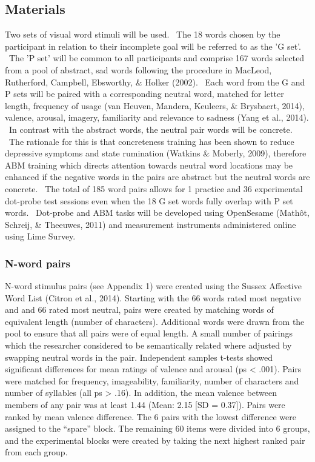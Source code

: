 \documentclass[man,a4paper,biblatex]{apa6}
\begin{document}
\subsection{Materials}

Two sets of visual word stimuli will be used. \ The 18 words chosen by
the participant in relation to their incomplete goal will be referred
to as the 'G set'. \ The 'P set' will be common to all participants
and comprise 167 words selected from a pool of abstract, sad words
following the procedure in MacLeod, Rutherford, Campbell, Ebsworthy, \&
Holker (2002). \ Each word from the G and P sets will be paired with
a corresponding neutral word, matched for letter length, frequency of
usage (van Heuven, Mandera, Keuleers, \& Brysbaert, 2014), valence,
arousal, imagery, familiarity and relevance to sadness (Yang et al.,
2014). \ In contrast with the abstract words, the neutral pair words will
be concrete. \ The rationale for this is that concreteness training has
been shown to reduce depressive symptoms and state rumination (Watkins \&
Moberly, 2009), therefore ABM training which directs attention towards
neutral word locations may be enhanced if the negative words in the
pairs are abstract but the neutral words are concrete. \ The total of
185 word pairs allows for 1 practice and 36 experimental dot-probe test
sessions even when the 18 G set words fully overlap with P set words. \
Dot-probe and ABM tasks will be developed using OpenSesame (Math\^ot,
Schreij, \& Theeuwes, 2011) and measurement instruments administered
online using Lime Survey.

\subsubsection{N-word pairs}

N-word stimulus pairs (see Appendix 1) were created using the Sussex
Affective Word List (Citron et al., 2014). Starting with the 66
words rated most negative and and 66 rated most neutral, pairs were
created by matching words of equivalent length (number of characters).
Additional words were drawn from the pool to ensure that all pairs were of
equal length.  A small number of pairings which the researcher considered
to be semantically related where adjusted by swapping neutral words in
the pair.  Independent samples t-tests showed significant differences for
mean ratings of valence and arousal (ps < .001).  Pairs were matched
for frequency, imageability, familiarity, number of characters and
number of syllables (all  ps > .16).  In addition, the mean valence
between members of any pair was at least 1.44  (Mean: 2.15 [SD = 0.37]).
Pairs were ranked by mean valence difference.  The 6 pairs with the
lowest difference were assigned to the “spare” block.  The remaining
60 items were divided into 6 groups, and the experimental blocks were
created by taking the next highest ranked pair from each group.
\end{document}
